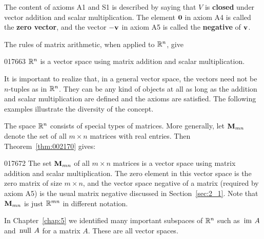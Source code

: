 \noindent The content of axioms A1 and S1 is described by saying that $V$ is \textbf{closed} under vector addition and scalar multiplication. The element $\textbf{0}$ in axiom A4 is called the \textbf{zero vector}, and the vector $-\textbf{v}$ in axiom A5 is called the \textbf{negative} of $\textbf{v}$.

The rules of matrix arithmetic, when applied to $\mathbb{R}^n$, give

\begin{example}{}{017663}
$\mathbb{R}^n$ is a vector space using matrix addition and scalar multiplication.\footnotemark
\end{example}

It is important to realize that, in a general vector space, the vectors need not be $n$-tuples as in $\mathbb{R}^n$. They can be any kind of objects at all as long as the addition and scalar multiplication are defined and the axioms are satisfied. The following examples illustrate the diversity of the concept.

The space $\mathbb{R}^n$ consists of special types of matrices. More generally, let $\textbf{M}_{mn}$ denote the set of all $m \times n$ matrices with real entries. Then Theorem~\ref{thm:002170} gives:

\begin{example}{}{017672}
The set $\textbf{M}_{mn}$ of all $m \times n$ matrices is a vector space using matrix addition and scalar multiplication. The zero element in this vector space is the zero matrix of size $m \times n$, and the vector space negative of a matrix (required by axiom A5) is the usual matrix negative discussed in Section~\ref{sec:2_1}. Note that $\textbf{M}_{mn}$ is just $\mathbb{R}^{mn}$ in different notation.
\end{example}

\noindent In Chapter~\ref{chap:5} we identified many important subspaces of $\mathbb{R}^n$ such as $\thinspace\operatorname{im\medspace} A$ and $\thinspace\operatorname{null\medspace} A$ for a matrix $A$. These are all vector spaces.


